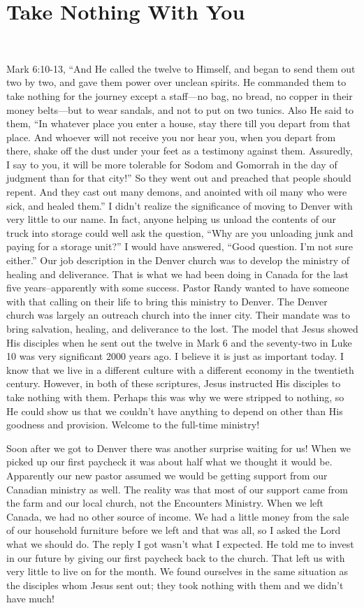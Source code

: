 \documentclass[oneside]{book}
\begin{document}
\section{Take Nothing With You}
\

Mark 6:10-13, “And He called the twelve to Himself, and began to send them out two by two, and gave them power over unclean spirits.  He commanded them to take nothing for the journey except a staff—no bag, no bread, no copper in their money belts—but to wear sandals, and not to put on two tunics. Also He said to them, “In whatever place you enter a house, stay there till you depart from that place. And whoever will not receive you nor hear you, when you depart from there, shake off the dust under your feet as a testimony against them. Assuredly, I say to you, it will be more tolerable for Sodom and Gomorrah in the day of judgment than for that city!” So they went out and preached that people should repent. And they cast out many demons, and anointed with oil many who were sick, and healed them.”
I didn’t realize the significance of moving to Denver with very little to our name. In fact, anyone helping us unload the contents of our truck into storage could well ask the question, “Why are you unloading junk and paying for a storage unit?” I would have answered, “Good question. I’m not sure either.” Our job description in the Denver church was to develop the ministry of healing and deliverance. That is what we had been doing in Canada for the last five years--apparently with some success. Pastor Randy wanted to have someone with that calling on their life to bring this ministry to Denver. The Denver church was largely an outreach church into the inner city. Their mandate was to bring salvation, healing, and deliverance to the lost. The model that Jesus showed His disciples when he sent out the twelve in Mark 6 and the seventy-two in Luke 10 was very significant 2000 years ago. I believe it is just as important today. I know that we live in a different culture with a different economy in the twentieth century. However, in both of these scriptures, Jesus instructed His disciples to take nothing with them. Perhaps this was why we were stripped to nothing, so He could show us that we couldn’t have anything to depend on other than His goodness and provision. Welcome to the full-time ministry!

Soon after we got to Denver there was another surprise waiting for us! When we picked up our first paycheck it was about half what we thought it would be. Apparently our new pastor assumed we would be getting support from our Canadian ministry as well. The reality was that most of our support came from the farm and our local church, not the Encounters Ministry. When we left Canada, we had no other source of income. We had a little money from the sale of our household furniture before we left and that was all, so I asked the Lord what we should do. The reply I got wasn’t what I expected. He told me to invest in our future by giving our first paycheck back to the church. That left us with very little to live on for the month. We found ourselves in the same situation as the disciples whom Jesus sent out; they took nothing with them and we didn’t have much!
\end{document}
